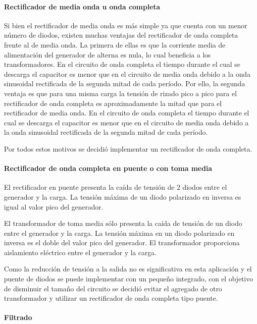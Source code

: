 \paragraph{Rectificador de media onda u onda completa}

Si bien el rectificador de media onda es más simple ya que cuenta con un menor número de diodos,
existen muchas ventajas del rectificador de onda completa frente al de media onda. 
La primera de ellas es que la corriente media de alimentación del generador de alterna es nula,
lo cual beneficia a los transformadores. 
En el circuito de onda completa el tiempo durante el cual se descarga el capacitor es menor que en el circuito de media onda
debido a la onda sinusoidal rectificada de la segunda mitad de cada período. 
Por ello, la segunda ventaja es que para una misma carga la tensión de rizado pico a pico para el rectificador de onda completa
es aproximadamente la mitad que para el rectificador de media onda. 
En el circuito de onda completa el tiempo durante el cual se descarga el capacitor es menor que en el circuito de media onda
debido a la onda sinusoidal rectificada de la segunda mitad de cada período. 

Por todos estos motivos se decidió implementar un rectificador de onda completa.

\paragraph{Rectificador de onda completa en puente o con toma media}

El rectificador en puente presenta la caída de tensión de 2 diodos entre el generador y la carga. 
La tensión máxima de un diodo polarizado en inversa es igual al valor pico del generador.

El transformador de toma media sólo presenta la caída de tensión de un diodo entre el generador y la carga.  
La tensión máxima en un diodo polarizado en inversa es el doble del valor pico del generador.
El transformador proporciona aislamiento eléctrico entre el generador y la carga. 

Como la reducción de tensión a la salida no es significativa en esta aplicación
y el puente de diodos se puede implementar con un pequeño integrado,
con el objetivo de disminuir el tamaño del circuito se decidió evitar el agregado de otro transformador
y utilizar un rectificador de onda completa tipo puente.

\paragraph{Filtrado}

